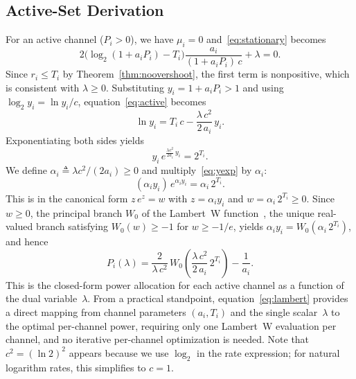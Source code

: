 \documentclass[journal]{IEEEtran}
\begin{document}
\subsection{Active-Set Derivation}

For an active channel ($P_i > 0$), we have $\mu_i = 0$ and~\eqref{eq:stationary} becomes
\begin{equation}
2\Big(\log_2(1+a_iP_i) - T_i\Big)\frac{a_i}{(1+a_iP_i)\,c} + \lambda = 0.
\label{eq:active}
\end{equation}
Since $r_i \le T_i$ by Theorem~\ref{thm:noovershoot}, the first term is nonpositive, which is consistent with $\lambda \ge 0$.
Substituting $y_i = 1 + a_i P_i > 1$ and using $\log_2 y_i = \ln y_i / c$, equation~\eqref{eq:active} becomes
\begin{equation}
\ln y_i = T_i\, c - \frac{\lambda\, c^2}{2\, a_i}\, y_i.
\label{eq:lny}
\end{equation}
Exponentiating both sides yields
\begin{equation}
y_i \, e^{\frac{\lambda c^2}{2a_i}\, y_i} = 2^{T_i}.
\label{eq:yexp}
\end{equation}
We define $\alpha_i \triangleq \lambda c^2 / (2a_i) \ge 0$ and multiply~\eqref{eq:yexp} by $\alpha_i$:
\begin{equation}
(\alpha_i y_i)\, e^{\alpha_i y_i} = \alpha_i\, 2^{T_i}.
\end{equation}
This is in the canonical form $z\,e^z = w$ with $z = \alpha_i y_i$ and $w = \alpha_i\, 2^{T_i} \ge 0$.
Since $w \ge 0$, the principal branch $W_0$ of the Lambert~W function~\cite{corless1996lambertw}, the unique real-valued branch satisfying $W_0(w) \ge -1$ for $w \ge -1/e$, yields $\alpha_i y_i = W_0(\alpha_i\, 2^{T_i})$, and hence
\begin{equation}
\boxed{
P_i(\lambda) = \frac{2}{\lambda\, c^2}\, W_0\!\left(\frac{\lambda\, c^2}{2\, a_i}\, 2^{T_i}\right) - \frac{1}{a_i}.
}
\label{eq:lambert}
\end{equation}
This is the closed-form power allocation for each active channel as a function of the dual variable~$\lambda$.
From a practical standpoint, equation~\eqref{eq:lambert} provides a direct mapping from channel parameters $(a_i, T_i)$ and the single scalar~$\lambda$ to the optimal per-channel power, requiring only one Lambert~W evaluation per channel, and no iterative per-channel optimization is needed.
Note that $c^2 = (\ln 2)^2$ appears because we use $\log_2$ in the rate expression; for natural logarithm rates, this simplifies to $c = 1$.
\end{document}
